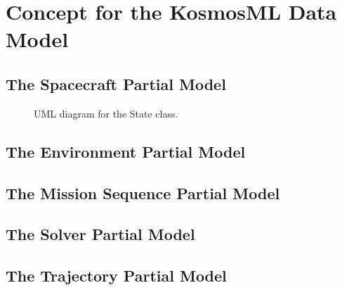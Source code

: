 \chapter{Concept for the KosmosML Data Model}
\label{sec:concept}

\section{The Spacecraft Partial Model}
\begin{figure}[ht]
    \centering
    \caption{UML diagram for the State class.}
    \label{fig:stateuml}
\end{figure}

\section{The Environment Partial Model}

\section{The Mission Sequence Partial Model}

\section{The Solver Partial Model}

\section{The Trajectory Partial Model}
